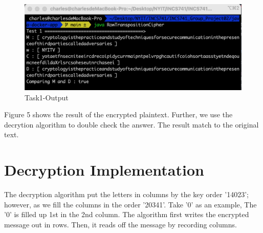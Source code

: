 \documentclass[twoside,twocolumn]{article}
\begin{document}
\begin{figure}[H]
  \centering
  \includegraphics[scale=0.35]{./Graphs/Figure1.6.png}
  \caption{Task1-Output}
  \label{fig:testfig1}
\end{figure}

Figure 5 shows the result of the encrypted plaintext. Further, we use the decrytion algorithm to double check the answer. The result match to the original text.\\ 

\vspace*{-3.0cm}
\section{Decryption Implementation}

The decryption algorithm put the letters in columns by the key order '14023'; however, as we fill the columns in the order '20341'. Take '0' as an example, The '0' is filled up 1st in the 2nd column. The algorithm first writes the encrypted message out in rows. Then, it reads off the message by recording columns. \\
\end{document}

